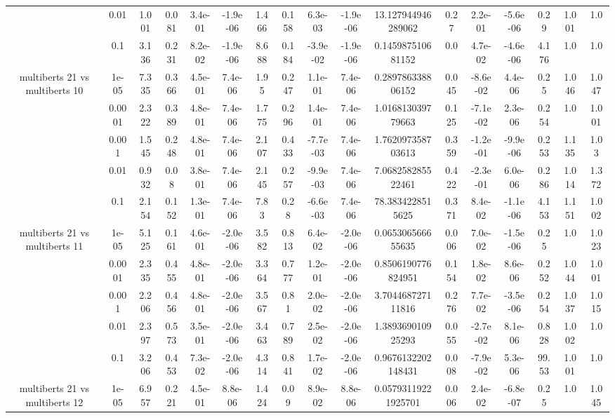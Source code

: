 \begin{tabular}{|c|c|c|c|c|c|c|c|c|c|c|c|c|c|c|c|c|}
 & 0.01 & 1.001 & 0.081 & 3.4e-01 & -1.9e-06 & 1.466 & 0.158 & 6.3e-03 & -1.9e-06 & 13.127944946289062 & 0.27 & 2.2e-01 & -5.6e-06 & 0.29 & 1.001 & 1.0 \\
 & 0.1 & 3.136 & 0.231 & 8.2e-02 & -1.9e-06 & 8.688 & 0.184 & -3.9e-02 & -1.9e-06 & 0.145987510681152 & 0.0 & 4.7e-02 & -4.6e-06 & 4.176 & 1.0 & 1.0 \\
\hline
\multirow{5}{*}{multiberts 21 vs multiberts 10} & 1e-05 & 7.335 & 0.366 & 4.5e-01 & 7.4e-06 & 1.95 & 0.247 & 1.1e-01 & 7.4e-06 & 0.289786338806152 & 0.045 & -8.6e-02 & 4.4e-06 & 0.25 & 1.046 & 1.047 \\
 & 0.0001 & 2.322 & 0.389 & 4.8e-01 & 7.4e-06 & 1.775 & 0.296 & 1.4e-01 & 7.4e-06 & 1.016813039779663 & 0.125 & -7.1e-02 & 2.3e-06 & 0.254 & 1.0 & 1.001 \\
 & 0.001 & 1.545 & 0.248 & 4.8e-01 & 7.4e-06 & 2.107 & 0.433 & -7.7e-03 & 7.4e-06 & 1.762097358703613 & 0.359 & -1.2e-01 & -9.9e-06 & 0.253 & 1.135 & 1.03 \\
 & 0.01 & 0.932 & 0.08 & 3.8e-01 & 7.4e-06 & 2.145 & 0.257 & -9.9e-03 & 7.4e-06 & 7.068258285522461 & 0.422 & -2.3e-01 & 6.0e-06 & 0.286 & 1.014 & 1.372 \\
 & 0.1 & 2.154 & 0.152 & 1.3e-01 & 7.4e-06 & 7.83 & 0.28 & -6.6e-03 & 7.4e-06 & 78.3834228515625 & 0.371 & 8.4e-02 & -1.1e-06 & 4.153 & 1.151 & 1.002 \\
\hline
\multirow{5}{*}{multiberts 21 vs multiberts 11} & 1e-05 & 5.125 & 0.161 & 4.6e-01 & -2.0e-06 & 3.582 & 0.813 & 6.4e-02 & -2.0e-06 & 0.065306566655635 & 0.006 & 7.0e-02 & -1.5e-06 & 0.25 & 1.0 & 1.023 \\
 & 0.0001 & 2.335 & 0.455 & 4.8e-01 & -2.0e-06 & 3.364 & 0.777 & 1.2e-01 & -2.0e-06 & 0.8506190776824951 & 0.154 & 1.8e-02 & 8.6e-06 & 0.252 & 1.044 & 1.001 \\
 & 0.001 & 2.206 & 0.456 & 4.8e-01 & -2.0e-06 & 3.567 & 0.81 & 2.0e-02 & -2.0e-06 & 3.704468727111816 & 0.276 & 7.7e-02 & -3.5e-06 & 0.254 & 1.037 & 1.015 \\
 & 0.01 & 2.397 & 0.573 & 3.5e-01 & -2.0e-06 & 3.463 & 0.789 & 2.5e-02 & -2.0e-06 & 1.389369010925293 & 0.055 & -2.7e-02 & 8.1e-06 & 0.828 & 1.002 & 1.0 \\
 & 0.1 & 3.206 & 0.453 & 7.3e-02 & -2.0e-06 & 4.314 & 0.841 & 1.7e-02 & -2.0e-06 & 0.9676132202148431 & 0.008 & -7.9e-02 & 5.3e-06 & 99.53 & 1.001 & 1.0 \\
\hline
\multirow{5}{*}{multiberts 21 vs multiberts 12} & 1e-05 & 6.957 & 0.221 & 4.5e-01 & 8.8e-06 & 1.424 & 0.09 & 8.9e-02 & 8.8e-06 & 0.05793119221925701 & 0.006 & 2.4e-02 & -6.8e-07 & 0.25 & 1.0 & 1.045 \\

\end{tabular}
